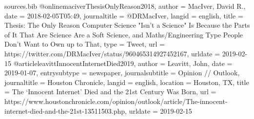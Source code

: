 %
%

\begin{filecontents}{sources.bib}
@online{maciverThesisOnlyReason2018,
  author = {MacIver, David R.},
  date = {2018-02-05T05:49},
  journaltitle = {@DRMacIver},
  langid = {english},
  title = {Thesis: The Only Reason {{Computer Science}} "Isn't a Science" Is Because the Parts of It That Are Science Are a Soft Science, and Maths/Engineering Type People Don't Want to Own up to That},
  type = {Tweet},
  url = {https://twitter.com/DRMacIver/status/960465314927452167},
  urldate = {2019-02-15}
}
@article{leavittInnocentInternetDied2019,
  author = {Leavitt, John},
  date = {2019-01-07},
  entrysubtype = {newspaper},
  journalsubtitle = {Opinion // Outlook},
  journaltitle = {Houston Chronicle},
  langid = {english},
  location = {{Houston, TX}},
  title = {The ‘Innocent Internet’ Died and the 21st Century Was Born},
  url = {https://www.houstonchronicle.com/opinion/outlook/article/The-innocent-internet-died-and-the-21st-13511503.php},
  urldate = {2019-02-15}
}
\end{filecontents}


\documentclass{article}
\thispagestyle{empty}   %

\usepackage[utf8]{inputenc}

\usepackage[strict=true]{csquotes}

\usepackage[
    backend=biber,
    bibencoding=utf8,
    style=chicago-authordate,
    urldate=iso,        %
    sorting=nyt,        %
]{biblatex}


